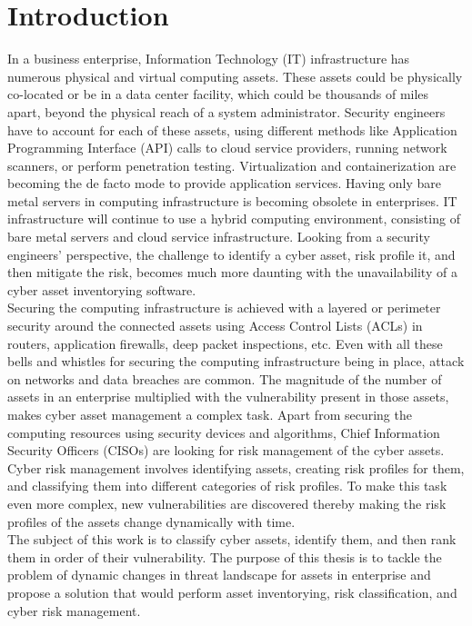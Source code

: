 \section{Introduction}\label{sec:introduction}
In a business enterprise, Information Technology (IT) infrastructure has numerous physical and virtual computing assets. These assets could be physically co-located or be in a data center facility, which could be thousands of miles apart, beyond the physical reach of a system administrator. Security engineers have to account for each of these assets, using different methods like Application Programming Interface (API) calls to cloud service providers, running network scanners, or perform penetration testing. Virtualization and containerization are becoming the de facto mode to provide application services. Having only bare metal servers in computing infrastructure is becoming obsolete in enterprises. IT infrastructure will continue to use a hybrid computing environment, consisting of bare metal servers and cloud service infrastructure. Looking from a security engineers' perspective, the challenge to identify a cyber asset, risk profile it, and then mitigate the risk, becomes much more daunting with the unavailability of a cyber asset inventorying software. \\
Securing the computing infrastructure is achieved with a layered or perimeter security around the connected assets using Access Control Lists (ACLs) in routers, application firewalls, deep packet inspections, etc. Even with all these bells and whistles for securing the computing infrastructure being in place, attack on networks and data breaches are common. The magnitude of the number of assets in an enterprise multiplied with the vulnerability present in those assets, makes cyber asset management a complex task. Apart from securing the computing resources using security devices and algorithms, Chief Information Security Officers (CISOs) are looking for risk management of the cyber assets. Cyber risk management involves identifying assets, creating risk profiles for them, and classifying them into different categories of risk profiles. To make this task even more complex, new vulnerabilities are discovered thereby making the risk profiles of the assets change dynamically with time. \\ 
The subject of this work is to classify cyber assets, identify them, and then rank them in order of their vulnerability. The purpose of this thesis is to tackle the problem of dynamic changes in threat landscape for assets in enterprise and propose a solution that would perform asset inventorying, risk classification, and cyber risk management.\\
